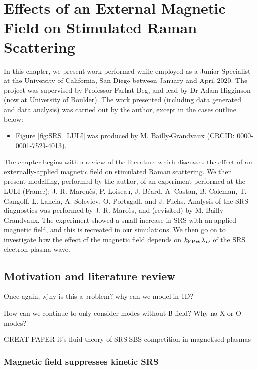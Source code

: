 \chapter{Effects of an External Magnetic Field on Stimulated Raman Scattering}
\label{chp:magSRS}

In this chapter, we present work performed while employed as a Junior Specialist at the University of California, San Diego between January and April 2020. The project was supervised by Professor Farhat Beg, and lead by Dr Adam Higginson (now at University of Boulder). The work presented (including data generated and data analysis) was carried out by the author, except in the cases outline below:
\begin{itemize}
\item Figure \ref{fig:SRS_LULI} was produced by M. Bailly-Grandvaux (\href{https://orcid.org/0000-0001-7529-4013}{ORCID: 0000-0001-7529-4013}).
\end{itemize}

The chapter begins with a review of the literature which discusses the effect of an externally-applied magnetic field on stimulated Raman scattering. We then present modelling, performed by the author, of an experiment performed at the \acrlong{LULI} (France): J. R. Marqu\`es, P. Loiseau, J. B\'eard, A. Castan, B. Coleman, T. Gangolf, L. Lancia, A. Soloviev, O. Portugall, and J. Fuchs. Analysis of the SRS diagnostics was performed by J. R. Marq\`es, and (revisited) by M. Bailly-Grandvaux.  The experiment showed a small increase in SRS with an applied magnetic field, and this is recreated in our simulations. We then go on to investigate how the effect of the magnetic field depends on $k_\mathrm{EPW}\lambda_D$ of the SRS electron plasma wave.

\section{Motivation and literature review}



Once again, wjhy is this a problem? why can we model in 1D? 

How can we continue to only consider modes without B field? Why no X or O modes?

GREAT PAPER it's fluid theory of SRS SBS competition in magnetised plasmas\citep{Vyas2016}

\subsection{Magnetic field suppresses kinetic SRS}

